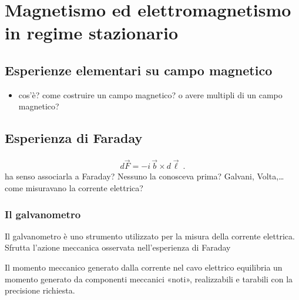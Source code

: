 \documentclass[letterpaper,10pt,italian]{jupyterBook}
\begin{document}
\sphinxstepscope


\section{Magnetismo ed elettromagnetismo in regime stazionario}
\label{\detokenize{ch/electromagnetism/electromagnetism-steady:magnetismo-ed-elettromagnetismo-in-regime-stazionario}}\label{\detokenize{ch/electromagnetism/electromagnetism-steady:physics-hs-electromagnetism-electromagnetism-steady}}\label{\detokenize{ch/electromagnetism/electromagnetism-steady::doc}}

\subsection{Esperienze elementari su campo magnetico}
\label{\detokenize{ch/electromagnetism/electromagnetism-steady:esperienze-elementari-su-campo-magnetico}}\begin{itemize}
\item {} 
\sphinxAtStartPar
cos’è? come costruire un campo magnetico? o avere multipli di un campo magnetico?

\end{itemize}


\subsection{Esperienza di Faraday}
\label{\detokenize{ch/electromagnetism/electromagnetism-steady:esperienza-di-faraday}}\begin{equation*}
\begin{split}d \vec{F} = - i \, \vec{b} \times d \vec{\ell} \ .\end{split}
\end{equation*}
\sphinxAtStartPar
{} ha senso associarla a Faraday? Nessuno la conosceva prima? Galvani, Volta,… come misuravano la corrente elettrica?


\subsubsection{Il galvanometro}
\label{\detokenize{ch/electromagnetism/electromagnetism-steady:il-galvanometro}}
\sphinxAtStartPar
Il galvanometro è uno strumento utilizzato per la misura della corrente elettrica. Sfrutta l’azione meccanica osservata nell’esperienza di Faraday

\sphinxAtStartPar
Il momento meccanico generato dalla corrente nel cavo elettrico equilibria un momento generato da componenti meccanici «noti», realizzabili e tarabili con la precisione richiesta.
\end{document}
